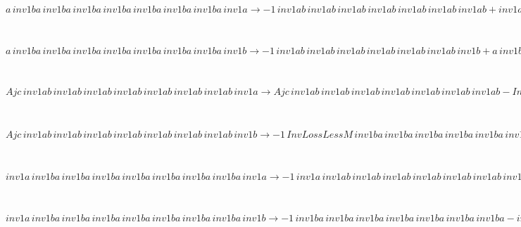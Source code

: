 \begin{minipage}{6in}
$
a\,
 inv1ba\,
 inv1ba\,
 inv1ba\,
 inv1ba\,
 inv1ba\,
 inv1ba\,
 inv1ba\,
 inv1a\rightarrow -1\,
 inv1ab\,
 inv1ab\,
 inv1ab\,
 inv1ab\,
 inv1ab\,
 inv1ab\,
 inv1ab + inv1ab\,
 inv1ab\,
 inv1ab\,
 inv1ab\,
 inv1ab\,
 inv1ab\,
 inv1ab\,
 inv1a
$
\end{minipage}\medskip \\
\begin{minipage}{6in}
$
a\,
 inv1ba\,
 inv1ba\,
 inv1ba\,
 inv1ba\,
 inv1ba\,
 inv1ba\,
 inv1ba\,
 inv1b\rightarrow -1\,
 inv1ab\,
 inv1ab\,
 inv1ab\,
 inv1ab\,
 inv1ab\,
 inv1ab\,
 inv1b + a\,
 inv1ba\,
 inv1ba\,
 inv1ba\,
 inv1ba\,
 inv1ba\,
 inv1ba\,
 inv1ba + inv1ab\,
 inv1ab\,
 inv1ab\,
 inv1ab\,
 inv1ab\,
 inv1ab\,
 inv1ab\,
 inv1b
$
\end{minipage}\medskip \\
\begin{minipage}{6in}
$
Ajc\,
 inv1ab\,
 inv1ab\,
 inv1ab\,
 inv1ab\,
 inv1ab\,
 inv1ab\,
 inv1ab\,
 inv1a\rightarrow Ajc\,
 inv1ab\,
 inv1ab\,
 inv1ab\,
 inv1ab\,
 inv1ab\,
 inv1ab\,
 inv1ab - InvLossLessM\,
 inv1ba\,
 inv1ba\,
 inv1ba\,
 inv1ba\,
 inv1ba\,
 inv1ba\,
 inv1a + InvLossLessM\,
 inv1ba\,
 inv1ba\,
 inv1ba\,
 inv1ba\,
 inv1ba\,
 inv1ba\,
 inv1ba\,
 inv1a
$
\end{minipage}\medskip \\
\begin{minipage}{6in}
$
Ajc\,
 inv1ab\,
 inv1ab\,
 inv1ab\,
 inv1ab\,
 inv1ab\,
 inv1ab\,
 inv1ab\,
 inv1b\rightarrow -1\,
 InvLossLessM\,
 inv1ba\,
 inv1ba\,
 inv1ba\,
 inv1ba\,
 inv1ba\,
 inv1ba\,
 inv1ba + InvLossLessM\,
 inv1ba\,
 inv1ba\,
 inv1ba\,
 inv1ba\,
 inv1ba\,
 inv1ba\,
 inv1ba\,
 inv1b
$
\end{minipage}\medskip \\
\begin{minipage}{6in}
$
inv1a\,
 inv1ba\,
 inv1ba\,
 inv1ba\,
 inv1ba\,
 inv1ba\,
 inv1ba\,
 inv1ba\,
 inv1a\rightarrow -1\,
 inv1a\,
 inv1ab\,
 inv1ab\,
 inv1ab\,
 inv1ab\,
 inv1ab\,
 inv1ab\,
 inv1ab + inv1ba\,
 inv1ba\,
 inv1ba\,
 inv1ba\,
 inv1ba\,
 inv1ba\,
 inv1ba\,
 inv1a + inv1a\,
 inv1ab\,
 inv1ab\,
 inv1ab\,
 inv1ab\,
 inv1ab\,
 inv1ab\,
 inv1ab\,
 inv1a
$
\end{minipage}\medskip \\
\begin{minipage}{6in}
$
inv1a\,
 inv1ba\,
 inv1ba\,
 inv1ba\,
 inv1ba\,
 inv1ba\,
 inv1ba\,
 inv1ba\,
 inv1b\rightarrow -1\,
 inv1ba\,
 inv1ba\,
 inv1ba\,
 inv1ba\,
 inv1ba\,
 inv1ba\,
 inv1ba - inv1a\,
 inv1ab\,
 inv1ab\,
 inv1ab\,
 inv1ab\,
 inv1ab\,
 inv1ab\,
 inv1b + inv1a\,
 inv1ba\,
 inv1ba\,
 inv1ba\,
 inv1ba\,
 inv1ba\,
 inv1ba\,
 inv1ba + inv1ba\,
 inv1ba\,
 inv1ba\,
 inv1ba\,
 inv1ba\,
 inv1ba\,
 inv1ba\,
 inv1b + inv1a\,
 inv1ab\,
 inv1ab\,
 inv1ab\,
 inv1ab\,
 inv1ab\,
 inv1ab\,
 inv1ab\,
 inv1b
$
\end{minipage}\medskip \\

